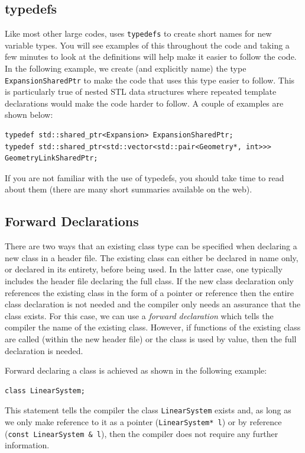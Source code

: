 \subsection{typedefs}
Like most other large codes, {\nek} uses
\lstinline{typedefs} to create short names for new variable types.  You will
see examples of this throughout the code and taking a few minutes to
look at the definitions will help make it easier to follow the code.
In the following example, we create (and explicitly name) the type
\lstinline{ExpansionSharedPtr} to make the code that uses this type easier
to follow. This is particularly true of nested STL data structures where repeated template declarations would make the code harder to follow. A couple of examples are shown below:
\begin{lstlisting}
typedef std::shared_ptr<Expansion> ExpansionSharedPtr;
typedef std::shared_ptr<std::vector<std::pair<Geometry*, int>>>
GeometryLinkSharedPtr;
\end{lstlisting}
If you are not familiar with the use of typedefs, you should take
time to read about them (there are many short summaries
available on the web).

\subsection{Forward Declarations}
There are two ways that an existing class
type can be specified when declaring a new class in a header file.  The
existing class can either be declared in name only, or declared in its entirety, before being used. In the latter case, one typically includes the header file declaring the full class. If the new class declaration only references the existing class in the form of a pointer or reference then the entire class declaration is not needed and the compiler only needs an assurance that the class exists. For this case, we can use a \emph{forward declaration} which tells the compiler the name of the existing class. 
However, if functions of the existing class are called (within the new header file) or the class is used by value, then the full declaration is needed.

Forward declaring a class is achieved as shown in the following example:
\begin{lstlisting}
class LinearSystem;
\end{lstlisting}
This statement tells the compiler the class \lstinline{LinearSystem} exists and, as long as we only make reference to it as a pointer (\lstinline{LinearSystem* l}) or by reference (\lstinline{const LinearSystem & l}), then the compiler does not require any further information.

